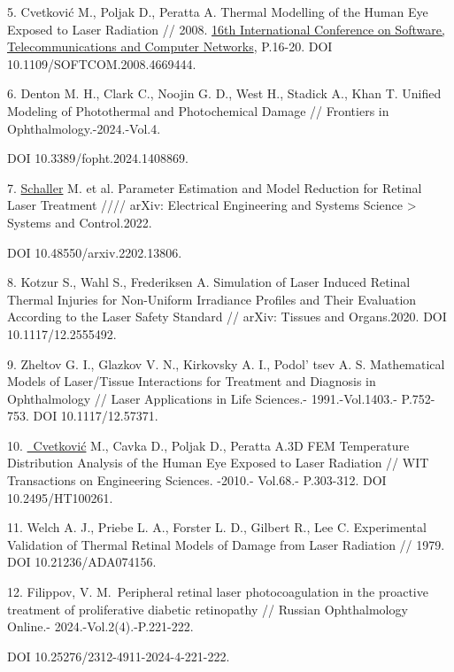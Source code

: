5. Cvetković M., Poljak D., Peratta A. Thermal Modelling of the Human Eye
Exposed to Laser Radiation // 2008.
\href{https://ieeexplore.ieee.org/xpl/conhome/4662489/proceeding}{16th
International Conference on Software, Telecommunications and Computer
Networks}, P.16-20. DOI 10.1109/SOFTCOM.2008.4669444.

6. Denton M. H., Clark C., Noojin G. D., West H., Stadick A., Khan T.
Unified Modeling of Photothermal and Photochemical Damage // Frontiers
in Ophthalmology.-2024.-Vol.4.

DOI 10.3389/fopht.2024.1408869.

7. \href{https://www.researchgate.net/profile/Manuel-Schaller-2?_tp=eyJjb250ZXh0Ijp7ImZpcnN0UGFnZSI6InB1YmxpY2F0aW9uIiwicGFnZSI6InB1YmxpY2F0aW9uIn19}{Schaller}
M. et al. Parameter Estimation and Model Reduction for Retinal Laser
Treatment //// arXiv: Electrical Engineering and Systems Science
\textgreater{} Systems and Control.2022.

DOI 10.48550/arxiv.2202.13806.

8. Kotzur S., Wahl S., Frederiksen A. Simulation of Laser Induced Retinal
Thermal Injuries for Non-Uniform Irradiance Profiles and Their
Evaluation According to the Laser Safety Standard // arXiv: Tissues and
Organs.2020. DOI 10.1117/12.2555492.

9. Zheltov G. I., Glazkov V. N., Kirkovsky A. I.,
Podol' tsev A. S. Mathematical Models of Laser/Tissue
Interactions for Treatment and Diagnosis in Ophthalmology // Laser
Applications in Life Sciences.- 1991.-Vol.1403.- P.752-753. DOI
10.1117/12.57371.

10. \href{https://www.researchgate.net/profile/Mario-Cvetkovic?_tp=eyJjb250ZXh0Ijp7ImZpcnN0UGFnZSI6InB1YmxpY2F0aW9uIiwicGFnZSI6InB1YmxpY2F0aW9uIn19}{~Cvetković}
M., Cavka D., Poljak D., Peratta A.3D FEM Temperature Distribution
Analysis of the Human Eye Exposed to Laser Radiation // WIT Transactions
on Engineering Sciences. -2010.- Vol.68.- P.303-312. DOI
10.2495/HT100261.

11. Welch A. J., Priebe L. A., Forster L. D., Gilbert R., Lee C.
Experimental Validation of Thermal Retinal Models of Damage from Laser
Radiation // 1979. DOI 10.21236/ADA074156.

12. Filippov, V. M.~Peripheral retinal laser photocoagulation in the
proactive treatment of proliferative diabetic retinopathy // Russian
Ophthalmology Online.- 2024.-Vol.2(4).-P.221-222.

DOI 10.25276/2312-4911-2024-4-221-222.

